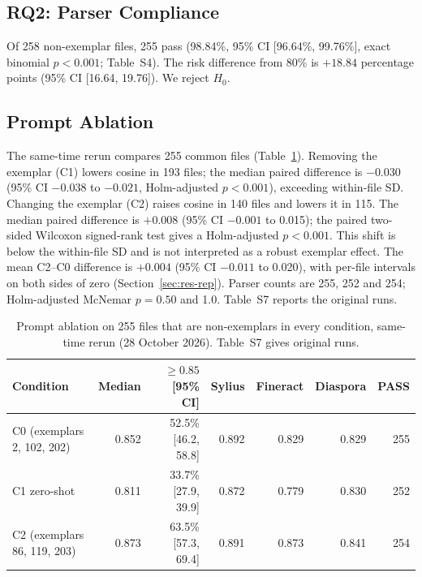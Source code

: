 \subsection{RQ2: Parser Compliance}

Of 258 non-exemplar files, 255 pass (98.84\%, 95\% CI [96.64\%, 99.76\%], exact binomial $p<0.001$; Table~S4). The risk difference from 80\% is $+18.84$ percentage points (95\% CI [16.64, 19.76]). We reject $H_0$.

\subsection{Prompt Ablation}
\label{sec:res-h2}

The same-time rerun compares 255 common files (Table~\ref{tab:h2}). Removing the exemplar (C1) lowers cosine in 193 files; the median paired difference is $-0.030$ (95\% CI $-0.038$ to $-0.021$, Holm-adjusted $p<0.001$), exceeding within-file SD. Changing the exemplar (C2) raises cosine in 140 files and lowers it in 115. The median paired difference is $+0.008$ (95\% CI $-0.001$ to 0.015); the paired two-sided Wilcoxon signed-rank test gives a Holm-adjusted $p<0.001$. This shift is below the within-file SD and is not interpreted as a robust exemplar effect. The mean C2--C0 difference is $+0.004$ (95\% CI $-0.011$ to 0.020), with per-file intervals on both sides of zero (Section~\ref{sec:res-rep}). Parser counts are 255, 252 and 254; Holm-adjusted McNemar $p=0.50$ and 1.0. Table~S7 reports the original runs.

\begin{table}[!htbp]
\centering
\caption{Prompt ablation on 255 files that are non-exemplars in every condition, same-time rerun (28 October 2026). Table~S7 gives original runs.}
\label{tab:h2}
\scriptsize
\setlength{\tabcolsep}{4pt}
\begin{tabular}{lrrrrrr}
\hline
Condition & Median & $\geq0.85$ [95\% CI] & Sylius & Fineract & Diaspora & PASS\\
\hline
C0 (exemplars 2, 102, 202) & 0.852 & 52.5\% [46.2, 58.8] & 0.892 & 0.829 & 0.829 & 255\\
C1 zero-shot & 0.811 & 33.7\% [27.9, 39.9] & 0.872 & 0.779 & 0.830 & 252\\
C2 (exemplars 86, 119, 203) & 0.873 & 63.5\% [57.3, 69.4] & 0.891 & 0.873 & 0.841 & 254\\
\hline
\end{tabular}
\end{table}

